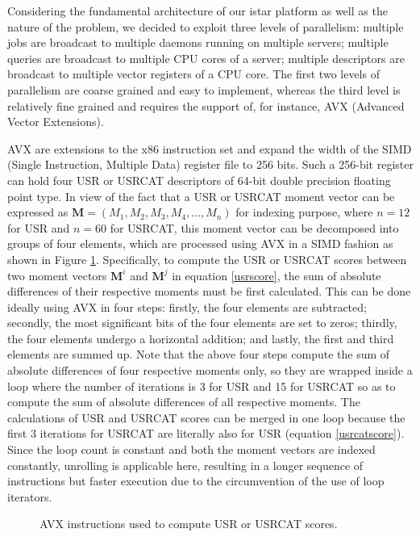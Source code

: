 \documentclass[a4,center,fleqn]{NAR}
\begin{document}
Considering the fundamental architecture of our istar platform \cite{1362} as well as the nature of the problem, we decided to exploit three levels of parallelism: multiple jobs are broadcast to multiple daemons running on multiple servers; multiple queries are broadcast to multiple CPU cores of a server; multiple descriptors are broadcast to multiple vector registers of a CPU core. The first two levels of parallelism are coarse grained and easy to implement, whereas the third level is relatively fine grained and requires the support of, for instance, AVX (Advanced Vector Extensions).

AVX are extensions to the x86 instruction set and expand the width of the SIMD (Single Instruction, Multiple Data) register file to 256 bits. Such a 256-bit register can hold four USR or USRCAT descriptors of 64-bit double precision floating point type. In view of the fact that a USR or USRCAT moment vector can be expressed as $\mathbf M=(M_1, M_2, M_3, M_4, \ldots, M_n)$ for indexing purpose, where $n=12$ for USR and $n=60$ for USRCAT, this moment vector can be decomposed into groups of four elements, which are processed using AVX in a SIMD fashion as shown in Figure \ref{AVX}. Specifically, to compute the USR or USRCAT scores between two moment vectors $\mathbf M^i$ and $\mathbf M^j$ in equation \eqref{usrscore}, the sum of absolute differences of their respective moments must be first calculated. This can be done ideally using AVX in four steps: firstly, the four elements are subtracted; secondly, the most significant bits of the four elements are set to zeros; thirdly, the four elements undergo a horizontal addition; and lastly, the first and third elements are summed up. Note that the above four steps compute the sum of absolute differences of four respective moments only, so they are wrapped inside a loop where the number of iterations is 3 for USR and 15 for USRCAT so as to compute the sum of absolute differences of all respective moments. The calculations of USR and USRCAT scores can be merged in one loop because the first 3 iterations for USRCAT are literally also for USR (equation \eqref{usrcatscore}). Since the loop count is constant and both the moment vectors are indexed constantly, unrolling is applicable here, resulting in a longer sequence of instructions but faster execution due to the circumvention of the use of loop iterators.

\begin{figure}
\begin{center}
\end{center}
\caption{AVX instructions used to compute USR or USRCAT scores.}
\label{AVX}
\end{figure}
\end{document}
